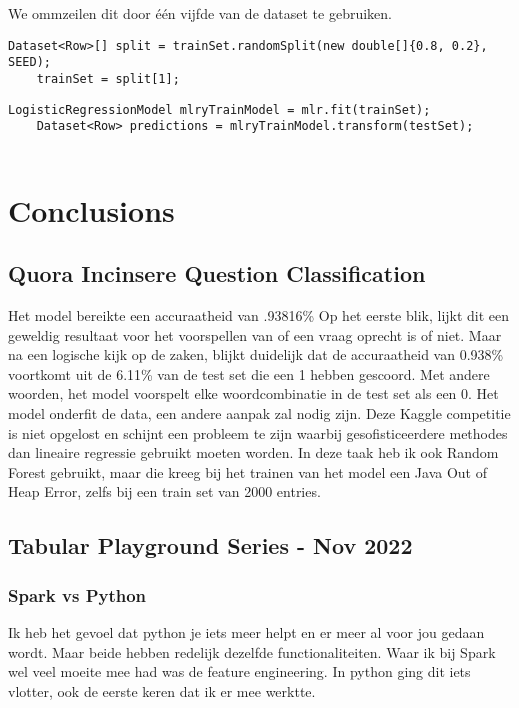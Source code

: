 We ommzeilen dit door één vijfde van de dataset te gebruiken.
\begin{lstlisting}[style=codeStyle]
    Dataset<Row>[] split = trainSet.randomSplit(new double[]{0.8, 0.2}, SEED); 
    trainSet = split[1];
\end{lstlisting}

\begin{lstlisting}[style=codeStyle]
	LogisticRegressionModel mlryTrainModel = mlr.fit(trainSet);
    Dataset<Row> predictions = mlryTrainModel.transform(testSet);
    
\end{lstlisting}


\section{Conclusions}
\label{sec:conclusions}
\subsection{Quora Incinsere Question Classification}
Het model bereikte een accuraatheid van .93816\%
Op het eerste blik, lijkt dit een geweldig resultaat voor het voorspellen van of een vraag oprecht is of niet.
Maar na een logische kijk op de zaken, blijkt duidelijk dat de accuraatheid van 0.938\% voortkomt uit de 6.11\% van de test set die een 1 hebben gescoord. Met andere woorden, het model voorspelt elke woordcombinatie in de test set als een 0. Het model onderfit de data, een andere aanpak zal nodig zijn. Deze Kaggle competitie is niet opgelost en schijnt een probleem te zijn waarbij gesofisticeerdere methodes dan lineaire regressie gebruikt moeten worden. In deze taak heb ik ook Random Forest gebruikt, maar die kreeg bij het trainen van het model een Java Out of Heap Error, zelfs bij een train set van 2000 entries. 

\subsection{Tabular Playground Series - Nov 2022}

\subsubsection{Spark vs Python}
Ik heb het gevoel dat python je iets meer helpt en er meer al voor jou gedaan wordt. Maar beide hebben redelijk dezelfde functionaliteiten. Waar ik bij Spark wel veel moeite mee had was de feature engineering. In python ging dit iets vlotter, ook de eerste keren dat ik er mee werktte.

